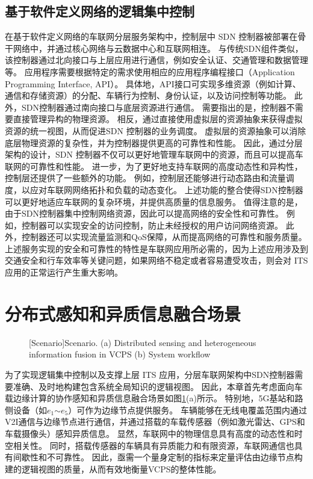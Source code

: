 \subsection{基于软件定义网络的逻辑集中控制}

在基于软件定义网络的车联网分层服务架构中，控制层中 SDN 控制器被部署在骨干网络中，并通过核心网络与云数据中心和互联网相连。
与传统SDN组件类似，该控制器通过北向接口与上层应用进行通信，例如安全认证、交通管理和数据管理等。
应用程序需要根据特定的需求使用相应的应用程序编程接口（Application Programming Interface, API）。
具体地，API接口可实现多维资源（例如计算、通信和存储资源）的分配、车辆行为控制、身份认证，以及访问控制等功能。
此外，SDN控制器通过南向接口与底层资源进行通信。
需要指出的是，控制器不需要直接管理异构的物理资源。
相反，通过直接使用虚拟层的资源抽象来获得虚拟资源的统一视图，从而促进SDN 控制器的业务调度。
虚拟层的资源抽象可以消除底层物理资源的复杂性，并为控制器提供更高的可靠性和性能。
因此，通过分层架构的设计，SDN 控制器不仅可以更好地管理车联网中的资源，而且可以提高车联网的可靠性和性能。
进一步，为了更好地支持车联网的高度动态性和异构性，控制层还提供了一些额外的功能。
例如，控制层还能够进行动态路由和流量调度，以应对车联网网络拓扑和负载的动态变化。
上述功能的整合使得SDN控制器可以更好地适应车联网的复杂环境，并提供高质量的信息服务。
值得注意的是，由于SDN控制器集中控制网络资源，因此可以提高网络的安全性和可靠性。
例如，控制器可以实现安全的访问控制，防止未经授权的用户访问网络资源。
此外，控制器还可以实现流量监测和QoS保障，从而提高网络的可靠性和服务质量。
上述服务实现的安全和可靠性的特性是车联网应用所必需的，因为上述应用涉及到交通安全和行车效率等关键问题，如果网络不稳定或者容易遭受攻击，则会对 ITS 应用的正常运行产生重大影响。


\section{分布式感知和异质信息融合场景}\label{section 2-3}

\begin{figure}[h]
     \centering
     [Scenario]{Scenario. (a) Distributed sensing and heterogeneous information fusion in VCPS (b) System workflow}
     \label{fig 2-2}
\end{figure}

为了实现逻辑集中控制以及支撑上层 ITS 应用，分层车联网架构中SDN控制器需要准确、及时地构建包含系统全局知识的逻辑视图。
因此，本章首先考虑面向车载边缘计算的协作感知和异质信息融合场景如图\ref{fig 2-2}(a)所示。
特别地，5G基站和路侧设备（如$e_1$$\sim$$e_5$）可作为边缘节点提供服务。
车辆能够在无线电覆盖范围内通过V2I通信与边缘节点进行通信，并通过搭载的车载传感器（例如激光雷达、GPS和车载摄像头）感知异质信息。
显然，车联网中的物理信息具有高度的动态性和时空相关性。
同时，搭载传感器的车辆具有异质能力和有限资源，车联网通信也具有间歇性和不可靠性。
因此，亟需一个量身定制的指标来定量评估由边缘节点构建的逻辑视图的质量，从而有效地衡量VCPS的整体性能。

